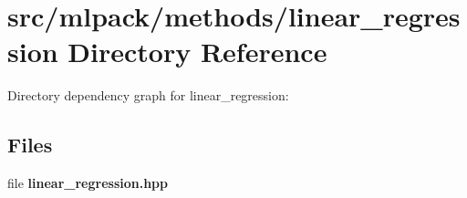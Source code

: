 \section{src/mlpack/methods/linear\-\_\-regression Directory Reference}
\label{dir_2179575762830b9a2c744fbdd110a5fb}
Directory dependency graph for linear\-\_\-regression\-:
\subsection*{Files}
\begin{DoxyCompactItemize}
\item 
file {\bf linear\-\_\-regression.\-hpp}
\end{DoxyCompactItemize}
